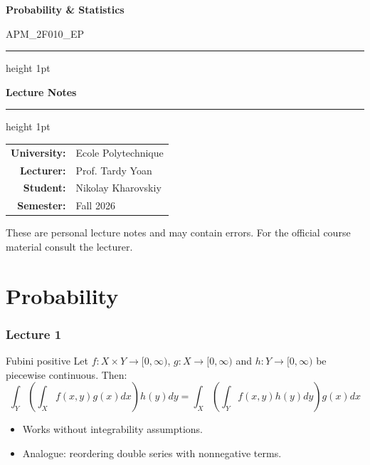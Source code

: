 \documentclass[11pt, a4paper]{article}
\newcommand{\CourseName}{Probability \& Statistics}
\newcommand{\CourseCode}{APM\_2F010\_EP}
\newcommand{\University}{Ecole Polytechnique}
\newcommand{\Lecturer}{Prof. Tardy Yoan}
\newcommand{\StudentName}{Nikolay Kharovskiy}
\newcommand{\Semester}{Fall 2026}
\begin{document}
\begin{titlepage}
  \centering
  \vspace*{2cm}

  {\Huge\bfseries \CourseName \par}
  \vspace{0.5cm}
  {\large \CourseCode \par}

  \vspace{1.5cm}
  \hrule height 1pt
  \vspace{0.4cm}
  {\Large\bfseries Lecture Notes \par}
  \vspace{0.4cm}
  \hrule height 1pt

  \vspace{2cm}

  \begin{tabular}{rl}
    \textbf{University:} & \University \\[4pt]
    \textbf{Lecturer:}   & \Lecturer   \\[4pt]
    \textbf{Student:}    & \StudentName \\[4pt]
    \textbf{Semester:}   & \Semester   \\[4pt]
  \end{tabular}

  \vfill

  {\small These are personal lecture notes and may contain errors.
         For the official course material consult the lecturer.}
\end{titlepage}

\tableofcontents
\newpage


\part{Probability}

\section{Lecture 1}

\begin{theorem}{Fubini positive}{}
Let $f: X \times Y \to [0,\infty)$, $g: X \to [0,\infty)$ and $h: Y \to [0,\infty)$ be piecewise continuous. Then:
\[\int_Y \left( \int_X f(x,y) g(x) dx \right) h(y) dy = \int_X \left( \int_Y f(x,y) h(y) dy \right) g(x) dx\]

\begin{itemize}
    \item Works without integrability assumptions.
    \item Analogue: reordering double series with nonnegative terms.
\end{itemize}
\end{theorem}
\end{document}
